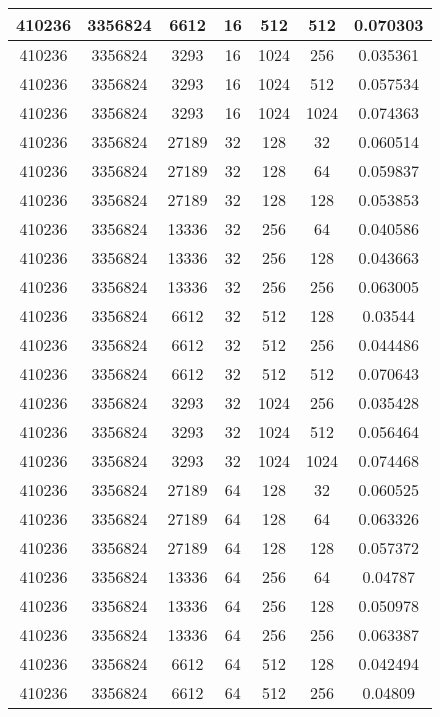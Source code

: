 \documentclass[9pt]{article}
\begin{document}
\begin{tabular}{|c|c|c|c|c|c|c| }
\hline
410236  & 3356824  & 6612  & 16  & 512  & 512  & 0.070303 \\
\hline
410236  & 3356824  & 3293  & 16  & 1024  & 256  & 0.035361 \\
\hline
410236  & 3356824  & 3293  & 16  & 1024  & 512  & 0.057534 \\
\hline
410236  & 3356824  & 3293  & 16  & 1024  & 1024  & 0.074363 \\
\hline
410236  & 3356824  & 27189  & 32  & 128  & 32  & 0.060514 \\
\hline
410236  & 3356824  & 27189  & 32  & 128  & 64  & 0.059837 \\
\hline
410236  & 3356824  & 27189  & 32  & 128  & 128  & 0.053853 \\
\hline
410236  & 3356824  & 13336  & 32  & 256  & 64  & 0.040586 \\
\hline
410236  & 3356824  & 13336  & 32  & 256  & 128  & 0.043663 \\
\hline
410236  & 3356824  & 13336  & 32  & 256  & 256  & 0.063005 \\
\hline
410236  & 3356824  & 6612  & 32  & 512  & 128  & 0.03544 \\
\hline
410236  & 3356824  & 6612  & 32  & 512  & 256  & 0.044486 \\
\hline
410236  & 3356824  & 6612  & 32  & 512  & 512  & 0.070643 \\
\hline
410236  & 3356824  & 3293  & 32  & 1024  & 256  & 0.035428 \\
\hline
410236  & 3356824  & 3293  & 32  & 1024  & 512  & 0.056464 \\
\hline
410236  & 3356824  & 3293  & 32  & 1024  & 1024  & 0.074468 \\
\hline
410236  & 3356824  & 27189  & 64  & 128  & 32  & 0.060525 \\
\hline
410236  & 3356824  & 27189  & 64  & 128  & 64  & 0.063326 \\
\hline
410236  & 3356824  & 27189  & 64  & 128  & 128  & 0.057372 \\
\hline
410236  & 3356824  & 13336  & 64  & 256  & 64  & 0.04787 \\
\hline
410236  & 3356824  & 13336  & 64  & 256  & 128  & 0.050978 \\
\hline
410236  & 3356824  & 13336  & 64  & 256  & 256  & 0.063387 \\
\hline
410236  & 3356824  & 6612  & 64  & 512  & 128  & 0.042494 \\
\hline
410236  & 3356824  & 6612  & 64  & 512  & 256  & 0.04809 \\

\end{tabular}
\end{document}
